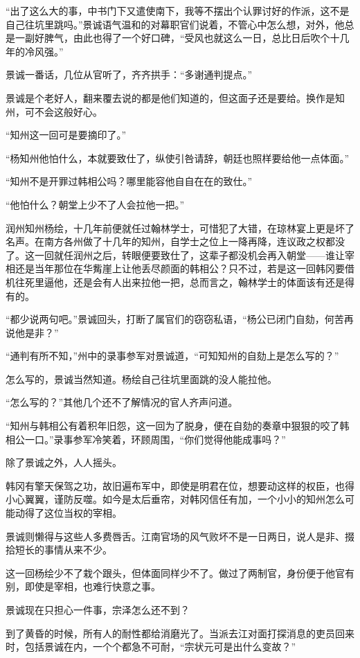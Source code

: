 “出了这么大的事，中书门下又遣使南下，我等不摆出个认罪讨好的作派，这不是自己往坑里跳吗。”景诚语气温和的对幕职官们说着，不管心中怎么想，对外，他总是一副好脾气，由此也得了一个好口碑，“受风也就这么一日，总比日后吹个十几年的冷风强。”

景诚一番话，几位从官听了，齐齐拱手：“多谢通判提点。”

景诚是个老好人，翻来覆去说的都是他们知道的，但这面子还是要给。换作是知州，可不会这般好心。

“知州这一回可是要摘印了。”

“杨知州他怕什么，本就要致仕了，纵使引咎请辞，朝廷也照样要给他一点体面。”

“知州不是开罪过韩相公吗？哪里能容他自自在在的致仕。”

“他怕什么？朝堂上少不了人会拉他一把。”

润州知州杨绘，十几年前便就任过翰林学士，可惜犯了大错，在琼林宴上更是坏了名声。在南方各州做了十几年的知州，自学士之位上一降再降，连议政之权都没了。这一回就任润州之后，转眼便要致仕了，这辈子都没机会再入朝堂——谁让宰相还是当年那位在华觜崖上让他丢尽颜面的韩相公？只不过，若是这一回韩冈要借机往死里逼他，还是会有人出来拉他一把，总而言之，翰林学士的体面该有还是得有的。

“都少说两句吧。”景诚回头，打断了属官们的窃窃私语，“杨公已闭门自劾，何苦再说他是非？”

“通判有所不知，”州中的录事参军对景诚道，“可知知州的自劾上是怎么写的？”

怎么写的，景诚当然知道。杨绘自己往坑里面跳的没人能拉他。

“怎么写的？”其他几个还不了解情况的官人齐声问道。

“知州与韩相公有着积年旧怨，这一回为了脱身，便在自劾的奏章中狠狠的咬了韩相公一口。”录事参军冷笑着，环顾周围，“你们觉得他能成事吗？”

除了景诚之外，人人摇头。

韩冈有擎天保驾之功，故旧遍布军中，即使是明君在位，想要动这样的权臣，也得小心翼翼，谨防反噬。如今是太后垂帘，对韩冈信任有加，一个小小的知州怎么可能动得了这位当权的宰相。

景诚则懒得与这些人多费唇舌。江南官场的风气败坏不是一日两日，说人是非、掇拾短长的事情从来不少。

这一回杨绘少不了栽个跟头，但体面同样少不了。做过了两制官，身份便于他官有别，即使是宰相，也难行快意之事。

景诚现在只担心一件事，宗泽怎么还不到？

到了黄昏的时候，所有人的耐性都给消磨光了。当派去江对面打探消息的吏员回来时，包括景诚在内，一个个都急不可耐，“宗状元可是出什么变故？”

